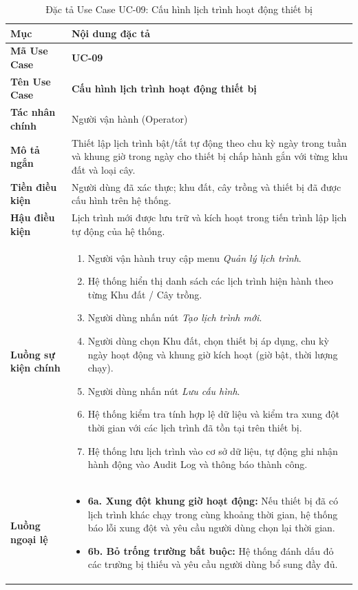 \begin{table}[H]
\centering
\small
\begin{tabularx}{\textwidth}{|p{3.2cm}|X|}
\hline
\textbf{Mục} & \textbf{Nội dung đặc tả} \\ \hline
\textbf{Mã Use Case} & \textbf{UC-09} \\ \hline
\textbf{Tên Use Case} & \textbf{Cấu hình lịch trình hoạt động thiết bị} \\ \hline
\textbf{Tác nhân chính} & Người vận hành (Operator) \\ \hline
\textbf{Mô tả ngắn} & Thiết lập lịch trình bật/tắt tự động theo chu kỳ ngày trong tuần và khung giờ trong ngày cho thiết bị chấp hành gắn với từng khu đất và loại cây. \\ \hline
\textbf{Tiền điều kiện} & Người dùng đã xác thực; khu đất, cây trồng và thiết bị đã được cấu hình trên hệ thống. \\ \hline
\textbf{Hậu điều kiện} & Lịch trình mới được lưu trữ và kích hoạt trong tiến trình lập lịch tự động của hệ thống. \\ \hline
\textbf{Luồng sự kiện chính} & 
\begin{enumerate}[leftmargin=*, nosep]
    \item Người vận hành truy cập menu \textit{Quản lý lịch trình}.
    \item Hệ thống hiển thị danh sách các lịch trình hiện hành theo từng Khu đất / Cây trồng.
    \item Người dùng nhấn nút \textit{Tạo lịch trình mới}.
    \item Người dùng chọn Khu đất, chọn thiết bị áp dụng, chu kỳ ngày hoạt động và khung giờ kích hoạt (giờ bật, thời lượng chạy).
    \item Người dùng nhấn nút \textit{Lưu cấu hình}.
    \item Hệ thống kiểm tra tính hợp lệ dữ liệu và kiểm tra xung đột thời gian với các lịch trình đã tồn tại trên thiết bị.
    \item Hệ thống lưu lịch trình vào cơ sở dữ liệu, tự động ghi nhận hành động vào Audit Log và thông báo thành công.
\end{enumerate} \\ \hline
\textbf{Luồng ngoại lệ} & 
\begin{itemize}[leftmargin=*, nosep]
    \item \textbf{6a. Xung đột khung giờ hoạt động:} Nếu thiết bị đã có lịch trình khác chạy trong cùng khoảng thời gian, hệ thống báo lỗi xung đột và yêu cầu người dùng chọn lại thời gian.
    \item \textbf{6b. Bỏ trống trường bắt buộc:} Hệ thống đánh dấu đỏ các trường bị thiếu và yêu cầu người dùng bổ sung đầy đủ.
\end{itemize} \\ \hline
\end{tabularx}
\caption{Đặc tả Use Case UC-09: Cấu hình lịch trình hoạt động thiết bị}
\label{tab:uc_09}
\end{table}

